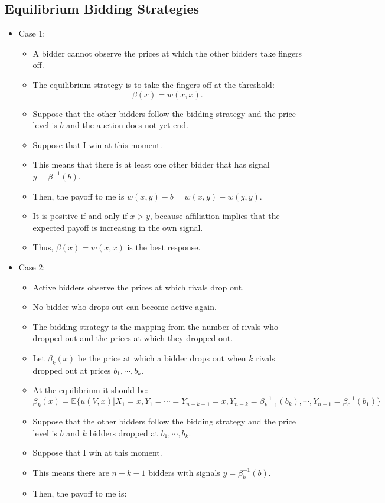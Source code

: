 \documentclass[]{book}
\providecommand{\tightlist}{%
  \setlength{\itemsep}{0pt}\setlength{\parskip}{0pt}}
\begin{document}
\subsection{Equilibrium Bidding
Strategies}\label{equilibrium-bidding-strategies}

\begin{itemize}
\tightlist
\item
  Case 1:

  \begin{itemize}
  \tightlist
  \item
    A bidder cannot observe the prices at which the other bidders take
    fingers off.
  \item
    The equilibrium strategy is to take the fingers off at the
    threshold: \[
    \beta(x) = w(x, x).
    \]
  \item
    Suppose that the other bidders follow the bidding strategy and the
    price level is \(b\) and the auction does not yet end.
  \item
    Suppose that I win at this moment.
  \item
    This means that there is at least one other bidder that has signal
    \(y = \beta^{-1}(b)\).
  \item
    Then, the payoff to me is \(w(x, y) - b = w(x, y) - w(y, y)\).
  \item
    It is positive if and only if \(x > y\), because affiliation implies
    that the expected payoff is increasing in the own signal.
  \item
    Thus, \(\beta(x) = w(x, x)\) is the best response.
  \end{itemize}
\item
  Case 2:

  \begin{itemize}
  \tightlist
  \item
    Active bidders observe the prices at which rivals drop out.
  \item
    No bidder who drops out can become active again.
  \item
    The bidding strategy is the mapping from the number of rivals who
    dropped out and the prices at which they dropped out.
  \item
    Let \(\beta_k(x)\) be the price at which a bidder drops out when
    \(k\) rivals dropped out at prices \(b_1, \cdots, b_k\).
  \item
    At the equilibrium it should be: \[
    \beta_k(x) = \mathbb{E}\{u(V, x)| X_1 = x, Y_1 = \cdots = Y_{n - k - 1} = x, Y_{n - k} = \beta_{k - 1}^{-1}(b_k), \cdots, Y_{n - 1} = \beta_0^{-1}(b_1)\}
    \]
  \item
    Suppose that the other bidders follow the bidding strategy and the
    price level is \(b\) and \(k\) bidders dropped at
    \(b_1, \cdots, b_k\).
  \item
    Suppose that I win at this moment.
  \item
    This means there are \(n - k - 1\) bidders with signals
    \(y = \beta_k^{-1}(b)\).
  \item
    Then, the payoff to me is:


\end{itemize}
\end{itemize}
\end{document}
